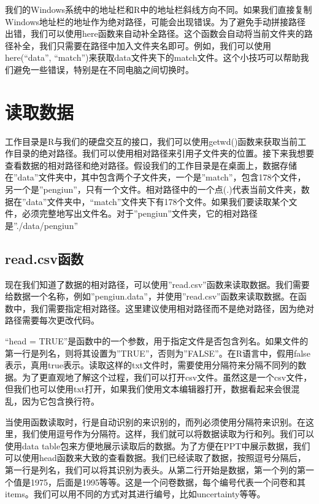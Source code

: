 \documentclass[
  oneside]{book}
\begin{document}
我们的Windows系统中的地址栏和R中的地址栏斜线方向不同。如果我们直接复制Windows地址栏的地址作为绝对路径，可能会出现错误。为了避免手动拼接路径出错，我们可以使用here函数来自动补全路径。这个函数会自动将当前文件夹的路径补全，我们只需要在路径中加入文件夹名即可。例如，我们可以使用here(``data'', ``match'')来获取data文件夹下的match文件。这个小技巧可以帮助我们避免一些错误，特别是在不同电脑之间切换时。

\hypertarget{3-read-data}{%
\section{读取数据}\label{3-read-data}}

工作目录是R与我们的硬盘交互的接口，我们可以使用getwd()函数来获取当前工作目录的绝对路径。我们可以使用相对路径来引用子文件夹的位置。接下来我想要查看数据的相对路径和绝对路径。假设我们的工作目录是在桌面上，数据存储在''data''文件夹中，其中包含两个子文件夹，一个是''match''，包含178个文件，另一个是''pengiun''，只有一个文件。相对路径中的一个点(.)代表当前文件夹，数据在''data''文件夹中，``match''文件夹下有178个文件。如果我们要读取某个文件，必须完整地写出文件名。对于''pengiun''文件夹，它的相对路径是''./data/pengiun''

\hypertarget{3-read-csv}{%
\subsection{read.csv函数}\label{3-read-csv}}

现在我们知道了数据的相对路径，可以使用''read.csv''函数来读取数据。我们需要给数据一个名称，例如''pengiun.data''，并使用''read.csv''函数来读取数据。在函数中，我们需要指定相对路径。这里建议使用相对路径而不是绝对路径，因为绝对路径需要每次更改代码。

``head = TRUE''是函数中的一个参数，用于指定文件是否包含列名。如果文件的第一行是列名，则将其设置为''TRUE''，否则为''FALSE''。在R语言中，假用false表示，真用true表示。读取这样的txt文件时，需要使用分隔符来分隔不同列的数据。为了更直观地了解这个过程，我们可以打开csv文件。虽然这是一个csv文件，但我们也可以使用txt打开，如果我们使用文本编辑器打开，数据看起来会很混乱，因为它包含换行符。

当使用函数读取时，行是自动识别的来识别的，而列必须使用分隔符来识别。在这里，我们使用逗号作为分隔符。这样，我们就可以将数据读取为行和列。我们可以使用data table包来方便地展示读取后的数据。为了方便在PPT中展示数据，我们可以使用head函数来大致的查看数据。我们已经读取了数据，按照逗号分隔后，第一行是列名，我们可以将其识别为表头。从第二行开始是数据，第一个列的第一个值是1975，后面是1995等等。这是一个问卷数据，每个编号代表一个问卷和其items。我们可以用不同的方式对其进行编号，比如uncertainty等等。
\end{document}
